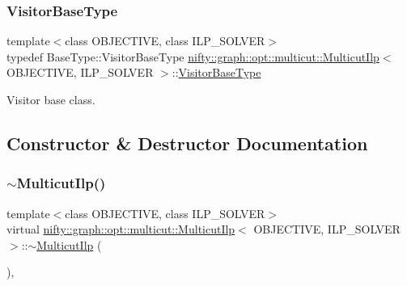 \mbox{\label{classnifty_1_1graph_1_1opt_1_1multicut_1_1MulticutIlp_a0fccd157c0176cba9c08f877b3798437}} 
\subsubsection{\texorpdfstring{Visitor\+Base\+Type}{VisitorBaseType}}
{\footnotesize\ttfamily template$<$class O\+B\+J\+E\+C\+T\+I\+VE, class I\+L\+P\+\_\+\+S\+O\+L\+V\+ER$>$ \\
typedef Base\+Type\+::\+Visitor\+Base\+Type \hyperlink{classnifty_1_1graph_1_1opt_1_1multicut_1_1MulticutIlp}{nifty\+::graph\+::opt\+::multicut\+::\+Multicut\+Ilp}$<$ O\+B\+J\+E\+C\+T\+I\+VE, I\+L\+P\+\_\+\+S\+O\+L\+V\+ER $>$\+::\hyperlink{classnifty_1_1graph_1_1opt_1_1multicut_1_1MulticutIlp_a0fccd157c0176cba9c08f877b3798437}{Visitor\+Base\+Type}}



Visitor base class. 



\subsection{Constructor \& Destructor Documentation}
\mbox{\label{classnifty_1_1graph_1_1opt_1_1multicut_1_1MulticutIlp_a82ada1b4fa2d00331e7d5d7fb7e6e910}} 
\subsubsection{\texorpdfstring{$\sim$\+Multicut\+Ilp()}{~MulticutIlp()}}
{\footnotesize\ttfamily template$<$class O\+B\+J\+E\+C\+T\+I\+VE, class I\+L\+P\+\_\+\+S\+O\+L\+V\+ER$>$ \\
virtual \hyperlink{classnifty_1_1graph_1_1opt_1_1multicut_1_1MulticutIlp}{nifty\+::graph\+::opt\+::multicut\+::\+Multicut\+Ilp}$<$ O\+B\+J\+E\+C\+T\+I\+VE, I\+L\+P\+\_\+\+S\+O\+L\+V\+ER $>$\+::$\sim$\hyperlink{classnifty_1_1graph_1_1opt_1_1multicut_1_1MulticutIlp}{Multicut\+Ilp} (\begin{DoxyParamCaption}{ }\end{DoxyParamCaption})\hspace{0.3cm}{\ttfamily [inline]}, {\ttfamily [virtual]}}

